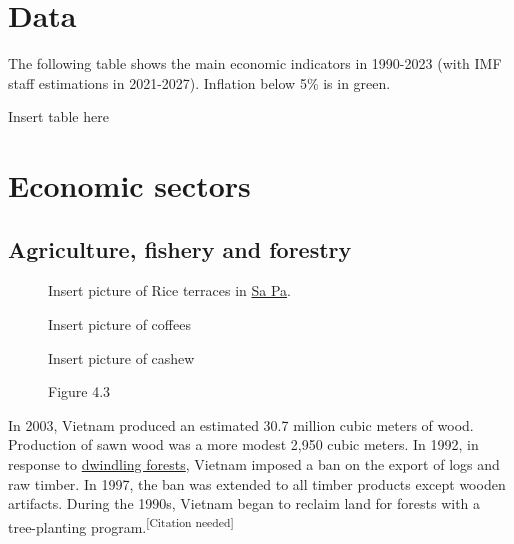 \documentclass[openany]{book}
\begin{document}
\chapter{Data}
The following table shows the main economic indicators in 1990-2023 (with IMF staff estimations in 2021-2027). Inflation below 5\% is in green.

\begin{table}[h]
    \centering
    Insert table here
    \caption*{Table 3.1}    
\end{table}

\chapter{Economic sectors}
\section{Agriculture, fishery and forestry}

\begin{figure}
    \begin{framed}
    Insert picture of Rice terraces in \href{https://en.wikipedia.org/wiki/Sa_Pa}{Sa Pa}.
    \caption*{Vietnam is the world's third-largest rice exporter.}
    \caption*{Figure 4.1}
    \end{framed}
    
    \begin{framed}
    Insert picture of coffees
    \caption*{Vietnam is the world's second-largest \href{https://en.wikipedia.org/wiki/Coffee}{coffee} producer and exporter.}
    \caption*{Figure 4.2}
    \end{framed}
    
    \begin{framed}
    Insert picture of cashew
    \caption*{Vietnam is the world's largest \href{https://en.wikipedia.org/wiki/Cashew}{cashew exporter}}    
    \caption*{Figure 4.3}
    \end{framed}
    
\end{figure}


In 2003, Vietnam produced an estimated 30.7 million cubic meters of wood. Production of sawn wood was a more modest 2,950 cubic meters. In 1992, in response to \href{https://en.wikipedia.org/wiki/Deforestation_in_Vietnam}{dwindling forests}, Vietnam imposed a ban on the export of logs and raw timber. In 1997, the ban was extended to all timber products except wooden artifacts. During the 1990s, Vietnam began to reclaim land for forests with a tree-planting program.\textsuperscript{[Citation needed]}
\end{document}
